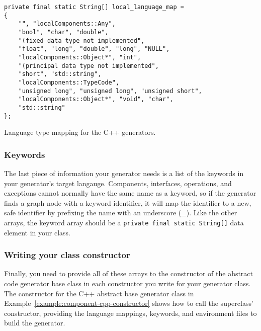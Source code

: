 \begin{Example}
\begin{minifbox}
\begin{small}
\begin{verbatim}
private final static String[] local_language_map =
{
    "", "localComponents::Any",
    "bool", "char", "double",
    "(fixed data type not implemented",
    "float", "long", "double", "long", "NULL",
    "localComponents::Object*", "int",
    "(principal data type not implemented",
    "short", "std::string",
    "localComponents::TypeCode",
    "unsigned long", "unsigned long", "unsigned short",
    "localComponents::Object*", "void", "char",
    "std::string"
};
\end{verbatim}
\end{small}
\end{minifbox}
\caption{Language type mapping for the C++ generators.}
\label{example:component-language-mapping}
\end{Example}

\subsubsection{Keywords}

The last piece of information your generator needs is a list of the keywords in
your generator's target langauge. Components, interfaces, operations, and
exceptions cannot normally have the same name as a keyword, so if the generator
finds a graph node with a keyword identifier, it will map the identifier to a
new, safe identifier by prefixing the name with an underscore (\_). Like the
other arrays, the keyword array should be a {\tt private final static String[]}
data element in your class.

\subsubsection{Writing your class constructor}

Finally, you need to provide all of these arrays to the constructor of the
abstract code generator base class in each constructor you write for your
generator class. The constructor for the C++ abstract base generator class in
Example~\ref{example:component-cpp-constructor} shows how to call the
superclass' constructor, providing the language mappings, keywords, and
environment files to build the generator.


